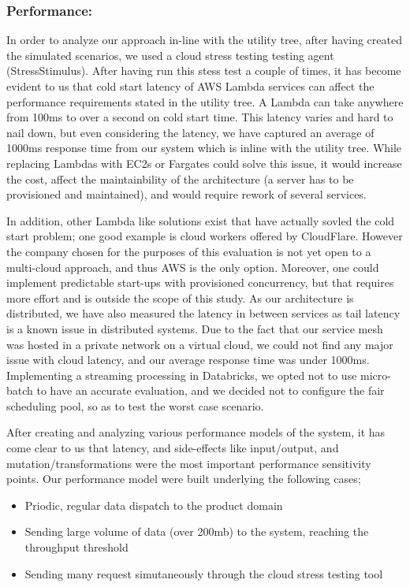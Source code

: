 \documentclass[review]{elsarticle}
\begin{document}
\subsubsection{Performance:} In order to analyze our approach in-line with the utility tree, after having created the simulated scenarios, we used a cloud stress testing testing agent (StressStimulus). After having run this stess test a couple of times, it has become evident to us that cold start latency of AWS Lambda services can affect the performance requirements stated in the utility tree. A Lambda can take anywhere from 100ms to over a second on cold start time. This latency varies and hard to nail down, but even considering the latency, we have captured an average of 1000ms response time from our system which is inline with the utility tree. While replacing Lambdas with EC2s or Fargates could solve this issue, it would increase the cost, affect the maintainbility of the architecture (a server has to be provisioned and maintained), and would require rework of several services.

In addition, other Lambda like solutions exist that have actually sovled the cold start problem; one good example is cloud workers offered by CloudFlare. However the company chosen for the purposes of this evaluation is not yet open to a multi-cloud approach, and thus AWS is the only option. Moreover, one could implement predictable start-ups with provisioned concurrency, but that requires more effort and is outside the scope of this study. As our architecture is distributed, we have also measured the latency in between services as tail latency is a known issue in distributed systems. Due to the fact that our service mesh was hosted in a private network on a virtual cloud, we could not find any major issue with cloud latency, and our average response time was under 1000ms. Implementing a streaming processing in Databricks, we opted not to use micro-batch to have an accurate evaluation, and we decided not to configure the fair scheduling pool, so as to test the worst case scenario.

After creating and analyzing various performance models of the system, it has come clear to us that latency, and side-effects like input/output, and mutation/transformations were the most important performance sensitivity points. Our performance model were built underlying the following cases;

\begin{itemize}
    \item Priodic, regular data dispatch to the product domain
    \item Sending large volume of data (over 200mb) to the system, reaching the throughput threshold
    \item Sending many request simutaneously through the cloud stress testing tool
\end{itemize}
\end{document}
